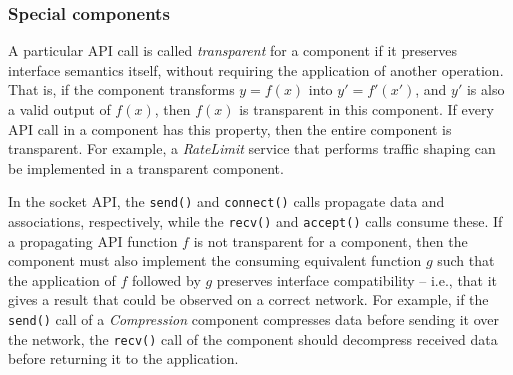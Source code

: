 %




\subsubsection{Special components}
\label{special}

A particular API call is called \textit{transparent} for a component
if it  preserves interface semantics itself, without
requiring the application of another 
operation. That is, if the component transforms 
$y = f(x)$ into $y' = f'(x')$, and
$y'$ is also a valid output of $f(x)$, then $f(x)$
is transparent in this component. If every API call 
in a component has this property, then the entire component 
is transparent. For example, a \textit{RateLimit} service 
that performs traffic shaping
can be implemented in a transparent component.

In the socket API, the \texttt{send()}
 and \texttt{connect()} calls propagate data and associations, 
 respectively, while the \texttt{recv()} and \texttt{accept()}
 calls consume these.
If a propagating API function $f$ is not transparent for a component, 
then the component must also implement the consuming equivalent function 
$g$ such that the application of $f$ followed by $g$ 
preserves interface compatibility -- i.e., that it gives a 
result that could be observed on a correct network. 
For example, if the \texttt{send()} call of a 
\textit{Compression} component 
compresses data before sending it over the network, 
the \texttt{recv()} call of the component should decompress 
received data before returning it to the application.


